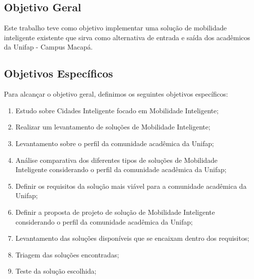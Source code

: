 \subsection{Objetivo Geral}
Este trabalho teve como objetivo implementar uma solução de mobilidade inteligente existente que sirva como alternativa de entrada e saída dos acadêmicos da Unifap - Campus Macapá.

\begin{comment}
Este trabalho tem como objetivo principal o estudo sobre Mobilidade Inteligente
considerando o contexto de mobilidade relacionado à Universidade Federal do Amapá
e realizar o debate sobre a viabilidade de utilização pela comunidade acadêmica em geral (docentes, discentes e técnicos) de soluções tecnológicas existentes, visando oferecer alternativa(s) de transporte que dê acesso e diminua problemas diários enfrentados para chegar e/ou sair da universidade.
\end{comment}

\subsection{Objetivos Específicos}

Para alcançar o objetivo geral, definimos os seguintes objetivos específicos:

\begin{enumerate}
\item Estudo sobre Cidades Inteligente focado em Mobilidade Inteligente;
\item Realizar um levantamento de soluções de Mobilidade Inteligente;
\item Levantamento sobre o perfil da comunidade acadêmica da Unifap;
\item Análise comparativa dos diferentes tipos de soluções de Mobilidade Inteligente considerando o perfil da comunidade acadêmica da Unifap;
\item Definir os requisitos da solução mais viável para a comunidade acadêmica da Unifap;
\item Definir a proposta de projeto de solução de Mobilidade Inteligente considerando o perfil da comunidade acadêmica da Unifap;
\item Levantamento das soluções disponíveis que se encaixam dentro dos requisitos;
\item Triagem das soluções encontradas;
\item Teste da solução escolhida;

\end{enumerate}

